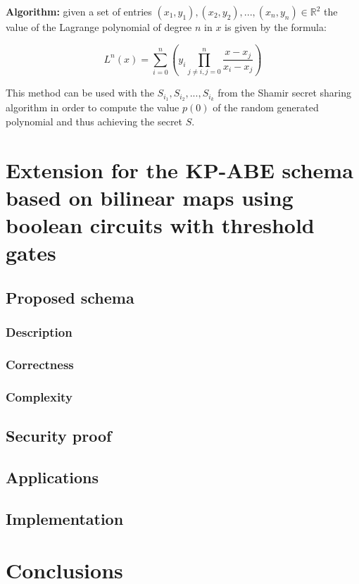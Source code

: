 \documentclass[12pt]{article}
\begin{document}
\textbf{Algorithm:} given a set of entries $(x_1, y_1), (x_2, y_2), ..., (x_n, y_n) \in \mathbb{R}^2$ the value of the Lagrange polynomial of degree $n$ in $x$ is given by the formula:

$$L^n(x) = \sum_{i = 0}^n(y_i\prod_{j \neq i, j = 0}^n \frac{x - x_j}{x_i - x_j})$$

This method can be used with the $S_{i_1}, S_{i_2}, ..., S_{i_k}$ from the Shamir secret sharing algorithm in order to compute the value $p(0)$ of the random generated polynomial and thus achieving the secret $S$.

\section{Extension for the KP-ABE schema based on bilinear maps using boolean circuits with threshold gates}

\subsection{Proposed schema}

\subsubsection{Description}
\subsubsection{Correctness}
\subsubsection{Complexity}

\subsection{Security proof}

\subsection{Applications}

\subsection{Implementation}

\section{Conclusions}
\end{document}
